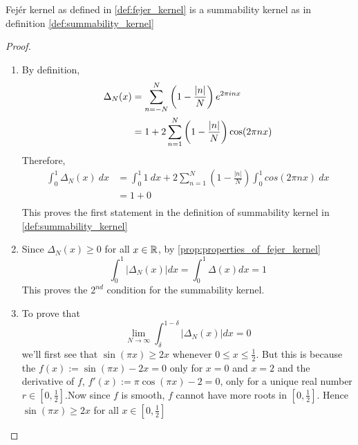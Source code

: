   \begin{proposition}
    \label{prop:fejer_kernel_is_summability_kernel}
    Fej\'er kernel as defined in \ref{def:fejer_kernel} is a summability kernel as in definition \ref{def:summability_kernel}
  \end{proposition}
  \begin{proof}
    \begin{enumerate}[label=(\alph*)]
      \item
        By definition,
        \begin{align*}
          \Delta_N(x) &= \sum_{n=-N}^{N}\left(1-\frac{\lvert n\rvert}{N}\right)e^{2\pi inx} \\
                      &= 1 + 2\sum_{n=1}^N \left(1-\frac{|n|}{N}\right)\cos(2\pi nx) \\
        \end{align*}
        Therefore, 
        \begin{align*}
          \int_0^1\Delta_N(x) \ dx &= \int_0^1 1\ dx + 2\sum_{n=1}^N \left(1 - \frac{|n|}{N}\right)\int_0^1cos(2\pi nx) \ dx \\
                &= 1 + 0 \\ 
        \end{align*}
        This proves the first statement in the definition of summability kernel in \ref{def:summability_kernel}

      \item
        Since $\Delta_N(x) \ge 0$ for all $x\in \mathbb R$, by \ref{prop:properties_of_fejer_kernel}
        \begin{displaymath}
          \int_0^1 \left|\Delta_N(x)\right| dx = \int_0^1 \Delta(x) dx = 1
        \end{displaymath}
        This proves the $2^{nd}$ condition for the summability kernel.
        
      \item
        To prove that 
        \begin{displaymath}
          \lim_{N \to \infty}\int_\delta^{1-\delta} \left|\Delta_N(x) \right| dx = 0
        \end{displaymath}
        we'll first see that $\sin(\pi x) \ge 2x$ whenever $0\le x\le \frac{1}{2}$. 
        But this is because the $f(x) := \sin(\pi x) - 2x = 0$ only for $x=0$ and $x=2$ and the derivative of $f$, $f'(x) := \pi \cos(\pi x) - 2 = 0$, only for a unique real number $r\in [0, \frac{1}{2}]$.Now since $f$ is smooth, $f$ cannot have more roots in $[0, \frac{1}{2}]$. Hence $\sin(\pi x) \ge 2x$ for all $x \in [0, \frac{1}{2}]$


\end{enumerate}
\end{proof}
